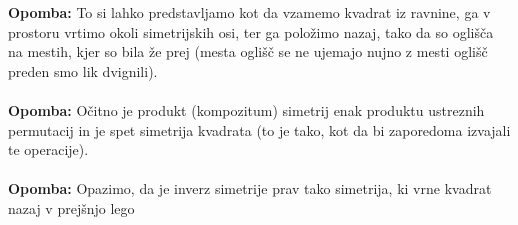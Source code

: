 \documentclass[a4paper]{article}
\newcounter{environment:definition_counter}
\newcounter{environment:theorem_counter}
\newcounter{environment:statement_counter}
\newenvironment{remark}
{\textbf{Opomba:}}
{}
\begin{document}
\begin{remark}
To si lahko predstavljamo kot da vzamemo kvadrat iz ravnine, ga v prostoru vrtimo okoli simetrijskih osi, ter ga položimo nazaj, tako da so oglišča na mestih, kjer so bila že prej (mesta oglišč se ne ujemajo nujno z mesti oglišč preden smo lik dvignili).
\end{remark}
\\
\\
\begin{remark}
Očitno je produkt (kompozitum) simetrij enak produktu ustreznih permutacij in je spet simetrija kvadrata (to je tako, kot da bi zaporedoma izvajali te operacije).
\end{remark}
\\
\\
\begin{remark}
Opazimo, da je inverz simetrije prav tako simetrija, ki vrne kvadrat nazaj v prejšnjo lego
\end{remark}
\\
\\
\end{document}
